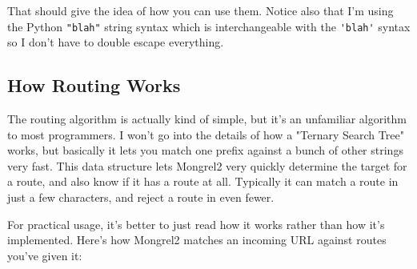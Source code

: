That should give the idea of how you can use them.  Notice also that I'm using the Python \verb|"blah"| string syntax which is
interchangeable with the \verb|'blah'| syntax so I don't have to double escape everything.

\subsection{How Routing Works}

The routing algorithm is actually kind of simple, but it's an unfamiliar algorithm
to most programmers.  I won't go into the details of how a "Ternary Search Tree"
works, but basically it lets you match one prefix against a bunch of other strings
very fast.  This data structure lets Mongrel2 very quickly determine the target
for a route, and also know if it has a route at all.  Typically it can match a route
in just a few characters, and reject a route in even fewer.

For practical usage, it's better to just read how it works rather than how it's
implemented.  Here's how Mongrel2 matches an incoming URL against routes you've
given it:


